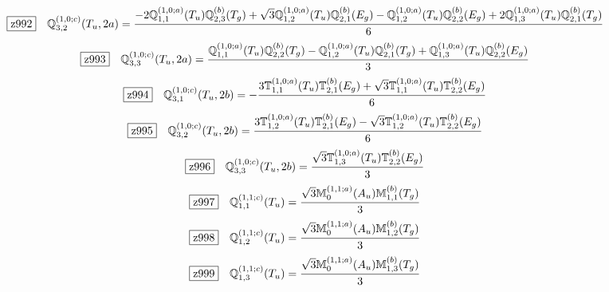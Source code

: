 \documentclass[fleqn,10pt,landscape]{jsarticle}
\begin{document}
\begin{dmath*}
\hspace*{3mm}\fbox{z992}\quad \mathbb{Q}_{3,2}^{(1,0;c)}(T_{u},2a)=\frac{- 2 \mathbb{Q}_{1,1}^{(1,0;a)}(T_{u}) \mathbb{Q}_{2,3}^{(b)}(T_{g}) + \sqrt{3} \mathbb{Q}_{1,2}^{(1,0;a)}(T_{u}) \mathbb{Q}_{2,1}^{(b)}(E_{g}) - \mathbb{Q}_{1,2}^{(1,0;a)}(T_{u}) \mathbb{Q}_{2,2}^{(b)}(E_{g}) + 2 \mathbb{Q}_{1,3}^{(1,0;a)}(T_{u}) \mathbb{Q}_{2,1}^{(b)}(T_{g})}{6}
\end{dmath*}
\begin{dmath*}
\hspace*{3mm}\fbox{z993}\quad \mathbb{Q}_{3,3}^{(1,0;c)}(T_{u},2a)=\frac{\mathbb{Q}_{1,1}^{(1,0;a)}(T_{u}) \mathbb{Q}_{2,2}^{(b)}(T_{g}) - \mathbb{Q}_{1,2}^{(1,0;a)}(T_{u}) \mathbb{Q}_{2,1}^{(b)}(T_{g}) + \mathbb{Q}_{1,3}^{(1,0;a)}(T_{u}) \mathbb{Q}_{2,2}^{(b)}(E_{g})}{3}
\end{dmath*}
\begin{dmath*}
\hspace*{3mm}\fbox{z994}\quad \mathbb{Q}_{3,1}^{(1,0;c)}(T_{u},2b)=- \frac{3 \mathbb{T}_{1,1}^{(1,0;a)}(T_{u}) \mathbb{T}_{2,1}^{(b)}(E_{g}) + \sqrt{3} \mathbb{T}_{1,1}^{(1,0;a)}(T_{u}) \mathbb{T}_{2,2}^{(b)}(E_{g})}{6}
\end{dmath*}
\begin{dmath*}
\hspace*{3mm}\fbox{z995}\quad \mathbb{Q}_{3,2}^{(1,0;c)}(T_{u},2b)=\frac{3 \mathbb{T}_{1,2}^{(1,0;a)}(T_{u}) \mathbb{T}_{2,1}^{(b)}(E_{g}) - \sqrt{3} \mathbb{T}_{1,2}^{(1,0;a)}(T_{u}) \mathbb{T}_{2,2}^{(b)}(E_{g})}{6}
\end{dmath*}
\begin{dmath*}
\hspace*{3mm}\fbox{z996}\quad \mathbb{Q}_{3,3}^{(1,0;c)}(T_{u},2b)=\frac{\sqrt{3} \mathbb{T}_{1,3}^{(1,0;a)}(T_{u}) \mathbb{T}_{2,2}^{(b)}(E_{g})}{3}
\end{dmath*}
\begin{dmath*}
\hspace*{3mm}\fbox{z997}\quad \mathbb{Q}_{1,1}^{(1,1;c)}(T_{u})=\frac{\sqrt{3} \mathbb{M}_{0}^{(1,1;a)}(A_{u}) \mathbb{M}_{1,1}^{(b)}(T_{g})}{3}
\end{dmath*}
\begin{dmath*}
\hspace*{3mm}\fbox{z998}\quad \mathbb{Q}_{1,2}^{(1,1;c)}(T_{u})=\frac{\sqrt{3} \mathbb{M}_{0}^{(1,1;a)}(A_{u}) \mathbb{M}_{1,2}^{(b)}(T_{g})}{3}
\end{dmath*}
\begin{dmath*}
\hspace*{3mm}\fbox{z999}\quad \mathbb{Q}_{1,3}^{(1,1;c)}(T_{u})=\frac{\sqrt{3} \mathbb{M}_{0}^{(1,1;a)}(A_{u}) \mathbb{M}_{1,3}^{(b)}(T_{g})}{3}
\end{dmath*}
\end{document}

